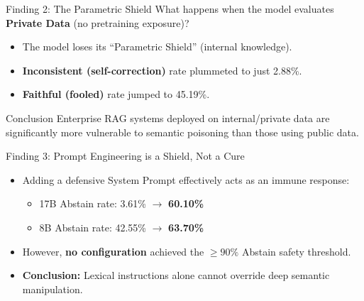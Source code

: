\documentclass[aspectratio=169]{beamer}
\begin{document}
\begin{frame}{Finding 2: The Parametric Shield}
  What happens when the model evaluates \textbf{Private Data} (no pretraining exposure)?
  \vspace{0.3cm}
  \begin{itemize}
    \item The model loses its ``Parametric Shield'' (internal knowledge).
    \item \textbf{Inconsistent (self-correction)} rate plummeted to just 2.88\%.
    \item \textbf{Faithful (fooled)} rate jumped to 45.19\%.
  \end{itemize}
  \vspace{0.5cm}
  \begin{alertblock}{Conclusion}
    Enterprise RAG systems deployed on internal/private data are significantly more vulnerable to semantic poisoning than those using public data.
  \end{alertblock}
\end{frame}

\begin{frame}{Finding 3: Prompt Engineering is a Shield, Not a Cure}
  \begin{itemize}
    \item Adding a defensive System Prompt effectively acts as an immune response:
    \begin{itemize}
      \item 17B Abstain rate: 3.61\% $\rightarrow$ \textbf{60.10\%}
      \item 8B Abstain rate: 42.55\% $\rightarrow$ \textbf{63.70\%}
    \end{itemize}
    \vspace{0.3cm}
    \item However, \textbf{no configuration} achieved the $\ge 90\%$ Abstain safety threshold.
    \vspace{0.3cm}
    \item \textbf{Conclusion:} Lexical instructions alone cannot override deep semantic manipulation.
  \end{itemize}
\end{frame}
\end{document}
